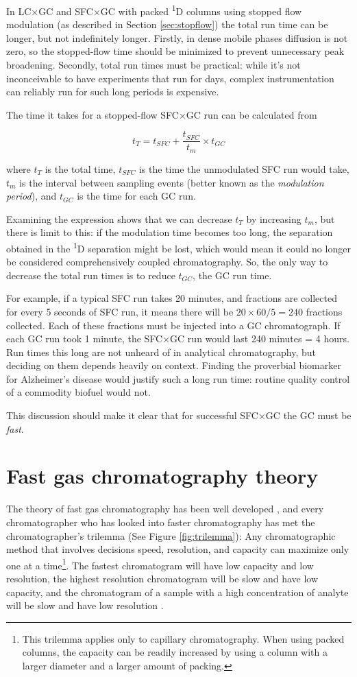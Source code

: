 In LC×GC and SFC×GC with packed \textsuperscript{1}D columns using stopped flow
modulation (as described in Section \ref{sec:stopflow}) the total run time can
be longer, but not indefinitely longer. Firstly, in dense mobile phases
diffusion is not zero, so the stopped-flow time should be minimized to prevent
unnecessary peak broadening. Secondly, total run times must be practical: while
it's not inconceivable to have experiments that run for days, complex
instrumentation can reliably run for such long periods is expensive.

The time it takes for a stopped-flow SFC×GC run can be calculated from

\[t_{T} = t_{SFC} + \frac{t_{SFC}}{t_{m}} \times t_{GC}\]

where \(t_T\) is the total time, \(t_{SFC}\) is the time the unmodulated SFC run
would take, \(t_m\) is the interval between sampling events (better known as the
\textit{modulation period}), and \(t_{GC}\) is the time for each GC run.

Examining the expression shows that we can decrease \(t_T\) by increasing
\(t_m\), but there is limit to this: if the modulation time becomes too long,
the separation obtained in the \textsuperscript{1}D separation might be lost,
which would mean it could no longer be considered comprehensively coupled
chromatography. So, the only way to decrease the total run times is to reduce
\(t_{GC}\), the GC run time.

For example, if a typical SFC run takes 20 minutes, and fractions are collected
for every 5 seconds of SFC run, it means there will be \( 20 \times 60 / 5 = 240
\) fractions collected. Each of these fractions must be injected into a GC
chromatograph. If each GC run took 1 minute, the SFC×GC run would last 240
minutes = 4 hours. Run times this long are not unheard of in analytical
chromatography, but deciding on them depends heavily on context.
Finding the proverbial biomarker for Alzheimer's disease would justify such a
long run time: routine quality control of a commodity biofuel would not.

This discussion should make it clear that for successful SFC×GC the GC
must be \textit{fast}.

\section{Fast gas chromatography theory}

The theory of fast gas chromatography has been well developed
\autocite{Blumberg1997}, and every chromatographer who has looked into faster
chromatography has met the chromatographer's trilemma (See Figure
\ref{fig:trilemma}): Any chromatographic method that involves decisions speed,
resolution, and capacity can maximize only one at a time\footnote{This trilemma
applies only to capillary chromatography. When using packed columns, the capacity
can be readily increased by using a column with a larger diameter and a larger
amount of packing.}. The fastest chromatogram will have low capacity and low
resolution, the highest resolution chromatogram will be slow and have low
capacity, and the chromatogram of a sample with a high concentration of analyte
will be slow and have low resolution \autocite{Klee2002}.

